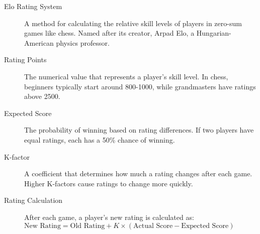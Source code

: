 \documentclass[11pt]{article}
\newenvironment{termbox}[1]
  {\begin{tcolorbox}[colback=blue!5!white,colframe=blue!75!black,title=#1,fonttitle=\bfseries]}
  {\end{tcolorbox}}
\begin{document}
\begin{termbox}{Key Technical Terms in Chess Rating}
\begin{description}
    \item[Elo Rating System] A method for calculating the relative skill levels of players in zero-sum games like chess. Named after its creator, Arpad Elo, a Hungarian-American physics professor.
    
    \item[Rating Points] The numerical value that represents a player's skill level. In chess, beginners typically start around 800-1000, while grandmasters have ratings above 2500.
    
    \item[Expected Score] The probability of winning based on rating differences. If two players have equal ratings, each has a 50\% chance of winning.
    
    \item[K-factor] A coefficient that determines how much a rating changes after each game. Higher K-factors cause ratings to change more quickly.
    
    \item[Rating Calculation] After each game, a player's new rating is calculated as: $\text{New Rating} = \text{Old Rating} + K \times (\text{Actual Score} - \text{Expected Score})$
\end{description}
\end{termbox}
\end{document}
